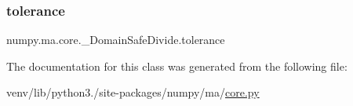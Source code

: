 \subsubsection{\texorpdfstring{tolerance}{tolerance}}
{\footnotesize\ttfamily numpy.\+ma.\+core.\+\_\+\+Domain\+Safe\+Divide.\+tolerance}



The documentation for this class was generated from the following file\+:\begin{DoxyCompactItemize}
\item 
venv/lib/python3./site-\/packages/numpy/ma/\hyperlink{numpy_2ma_2core_8py}{core.\+py}\end{DoxyCompactItemize}
